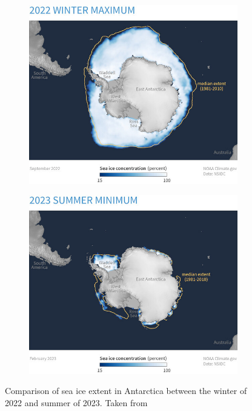 \begin{figure}[H]
	\centering
	\begin{subfigure}[t]{.48\linewidth}
		\includegraphics[width=\linewidth]{Figures/LiteratureReview/AntarcticClimate/seaIceExtentWinter2022.png} 
	\end{subfigure}
	\hfill
	\begin{subfigure}[t]{.48\linewidth}
        \centering
		\includegraphics[width=\linewidth]{Figures/LiteratureReview/AntarcticClimate/seaIceExtentSummer2023.png} 
	\end{subfigure}
    \caption{Comparison of sea ice extent in Antarctica between the winter of 2022 and summer of 2023. Taken from \cite{Scott2023}}
    \label{fig:litReview.antarcticClimate.seaIceExtent2022}
\end{figure}

